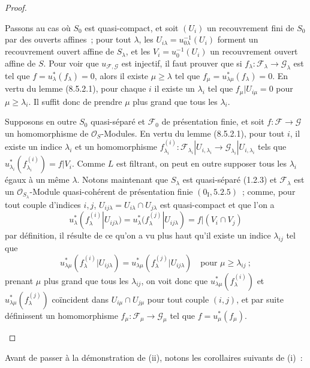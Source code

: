 \begin{proof}
\begin{enumerate}[label=(\roman*)]
  Passons au cas où $S_0$ est quasi-compact, et soit $(U_i)$ un recouvrement
  fini de $S_0$ par des ouverts affines~; pour tout $\lambda$, les
  $U_{i\lambda}=u_{0\lambda}^{-1}(U_i)$ forment un recouvrement ouvert affine de
  $S_\lambda$, et les $V_i=u_0^{-1}(U_i)$ un recouvrement ouvert affine de $S$.
  Pour voir que $u_{\mathcal F,\mathcal G}$ est injectif, il faut prouver que
  si $f_\lambda:\mathcal F_\lambda\to\mathcal G_\lambda$ est tel que
  $f=u_\lambda^*(f_\lambda)=0$, alors il existe $\mu\geq\lambda$ tel que
  $f_\mu=u_{\lambda\mu}^*(f_\lambda)=0$. En vertu du lemme (8.5.2.1), pour
  chaque $i$ il existe un $\lambda_i$ tel que
  $f_\mu|U_{i\mu}=0$ pour $\mu\geq\lambda_i$. Il suffit donc de prendre $\mu$
  plus grand que tous les $\lambda_i$.

  Supposons en outre $S_0$ quasi-séparé et $\mathcal F_0$ de présentation finie,
  et soit $f:\mathcal F\to\mathcal G$ un homomorphisme de
  $\mathcal O_S$-Modules. En vertu du lemme (8.5.2.1), pour tout $i$, il existe
  un indice $\lambda_i$ et un homomorphisme
  $f_{\lambda_i}^{(i)}:\mathcal F_{\lambda_i}|U_{i,\lambda_i}
  \to\mathcal G_{\lambda_i}|U_{i,\lambda_i}$ tels que
  $u_{\lambda_i}^*(f_{\lambda_i}^{(i)})=f|V_i$. Comme $L$ est filtrant, on peut
  en outre supposer tous les $\lambda_i$ égaux à un même $\lambda$. Notons
  maintenant que $S_\lambda$ est quasi-séparé (1.2.3) et
  $\mathcal F_\lambda$ est un $\mathcal O_{S_\lambda}$-Module quasi-cohérent de
  présentation finie $(0_{\mathrm I},5.2.5)$~; comme, pour tout couple d'indices
  $i,j$, $U_{ij\lambda}=U_{i\lambda}\cap U_{j\lambda}$ est quasi-compact et que
  l'on a
  \[
    u_\lambda^*(f_\lambda^{(i)}|U_{ij\lambda})
    =u_\lambda^*(f_\lambda^{(j)}|U_{ij\lambda})
    =f|(V_i\cap V_j)
  \]
  par définition, il résulte de ce qu'on a vu plus haut qu'il existe un indice
  $\lambda_{ij}$ tel que
  \[
    u_{\lambda\mu}^*(f_\lambda^{(i)}|U_{ij\lambda})
    =u_{\lambda\mu}^*(f_\lambda^{(j)}|U_{ij\lambda})
    \quad\text{pour }\mu\geq\lambda_{ij}~;
  \]
  prenant $\mu$ plus grand que tous les $\lambda_{ij}$, on voit donc que
  $u_{\lambda\mu}^*(f_\lambda^{(i)})$ et
  $u_{\lambda\mu}^*(f_\lambda^{(j)})$ coïncident dans
  $U_{i\mu}\cap U_{j\mu}$ pour tout couple $(i,j)$, et par suite définissent
  un homomorphisme $f_\mu:\mathcal F_\mu\to\mathcal G_\mu$ tel que
  $f=u_\mu^*(f_\mu)$.
\end{enumerate}
\end{proof}

Avant de passer à la démonstration de (ii), notons les corollaires suivants de
(i)~:

